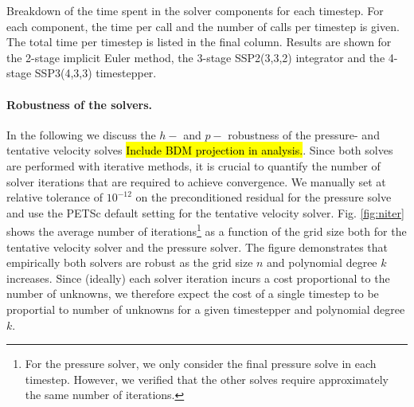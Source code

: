 \documentclass[11pt]{article}
\begin{document}
\begin{table}
    
    \begin{center}
        \caption{Breakdown of the time spent in the solver components for each timestep. For each component, the time per call and the number of calls per timestep is given. The total time per timestep is listed in the final column. Results are shown for the 2-stage implicit Euler method, the 3-stage SSP2(3,3,2) integrator and the 4-stage SSP3(4,3,3) timestepper.}
        \label{tab:time_per_iteration_breakdown}
    \end{center}
\end{table}
\paragraph{Robustness of the solvers.}
In the following we discuss the $h-$ and $p-$ robustness of the pressure- and tentative velocity solves \hl{Include BDM projection in analysis.}. Since both solves are performed with iterative methods, it is crucial to quantify the number of solver iterations that are required to achieve convergence. We manually set at relative tolerance of $10^{-12}$ on the preconditioned residual for the pressure solve and use the PETSc default setting for the tentative velocity solver. Fig. \ref{fig:niter} shows the average number of iterations\footnote{For the pressure solver, we only consider the final pressure solve in each timestep. However, we verified that the other solves require approximately the same number of iterations.} as a function of the grid size both for the tentative velocity solver and the pressure solver. The figure demonstrates that empirically both solvers are robust as the grid size $n$ and polynomial degree $k$ increases. Since (ideally) each solver iteration incurs a cost proportional to the number of unknowns, we therefore expect the cost of a single timestep to be proportial to number of unknowns for a given timestepper and polynomial degree $k$.
\end{document}
